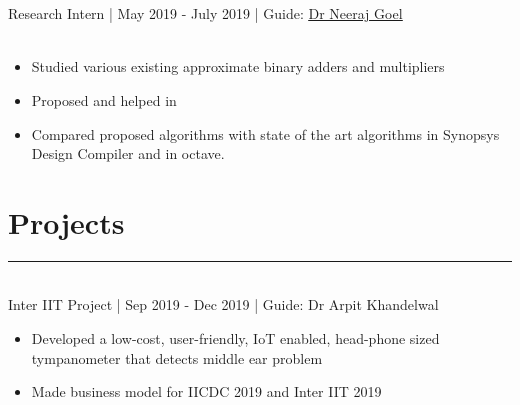 \documentclass[]{resume}
\begin{document}
\begin{minipage}[t]{0.66\textwidth}
\vspace{0.2em}
\hspace{1em}
\\
\vspace{-1em}\\
\hspace*{1em}Research Intern | May 2019 - July 2019 | Guide: \href{mailto: neeraj@iitrpr.ac.in }{\underline{Dr Neeraj Goel}}\\
\vspace*{-3em}\\
\descript{}
\begin{itemize}
    \item Studied various existing approximate binary adders and multipliers 
    \vspace{-0.6em}\\
    \item Proposed  and helped in 
    \vspace{-0.6em}\\
    \item Compared proposed algorithms with state of the art algorithms in Synopsys Design Compiler and in octave.
\end{itemize}
\sectionsep

\vspace{-1.5em}
\section{Projects}
\vspace{-0.5em}
\noindent\rule{12.5cm}{0.4pt}

\vspace{0.2em}
\hspace{1em}
\\
\hspace*{1em} Inter IIT Project | Sep 2019 - Dec 2019 | Guide: Dr Arpit Khandelwal\\ 
\vspace{-2em}
\descript{}
\begin{itemize}
    \item Developed a low-cost, user-friendly, IoT enabled, head-phone sized tympanometer that detects middle ear problem
    \vspace{-0.6em}\\
    \item Made business model for IICDC 2019 and Inter IIT 2019
\end{itemize}
\sectionsep


\end{minipage}
\end{document}

